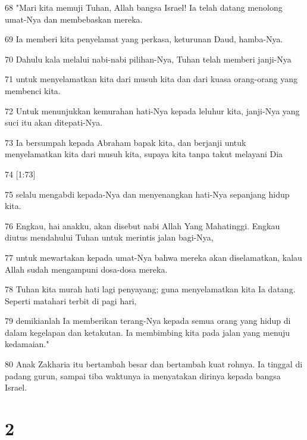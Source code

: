 \par 68 "Mari kita memuji Tuhan, Allah bangsa Israel! Ia telah datang menolong umat-Nya dan membebaskan mereka.
\par 69 Ia memberi kita penyelamat yang perkasa, keturunan Daud, hamba-Nya.
\par 70 Dahulu kala melalui nabi-nabi pilihan-Nya, Tuhan telah memberi janji-Nya
\par 71 untuk menyelamatkan kita dari musuh kita dan dari kuasa orang-orang yang membenci kita.
\par 72 Untuk menunjukkan kemurahan hati-Nya kepada leluhur kita, janji-Nya yang suci itu akan ditepati-Nya.
\par 73 Ia bersumpah kepada Abraham bapak kita, dan berjanji untuk menyelamatkan kita dari musuh kita, supaya kita tanpa takut melayani Dia
\par 74 [1:73]
\par 75 selalu mengabdi kepada-Nya dan menyenangkan hati-Nya sepanjang hidup kita.
\par 76 Engkau, hai anakku, akan disebut nabi Allah Yang Mahatinggi. Engkau diutus mendahului Tuhan untuk merintis jalan bagi-Nya,
\par 77 untuk mewartakan kepada umat-Nya bahwa mereka akan diselamatkan, kalau Allah sudah mengampuni dosa-dosa mereka.
\par 78 Tuhan kita murah hati lagi penyayang; guna menyelamatkan kita Ia datang. Seperti matahari terbit di pagi hari,
\par 79 demikianlah Ia memberikan terang-Nya kepada semua orang yang hidup di dalam kegelapan dan ketakutan. Ia membimbing kita pada jalan yang menuju kedamaian."
\par 80 Anak Zakharia itu bertambah besar dan bertambah kuat rohnya. Ia tinggal di padang gurun, sampai tiba waktunya ia menyatakan dirinya kepada bangsa Israel.

\chapter{2}

